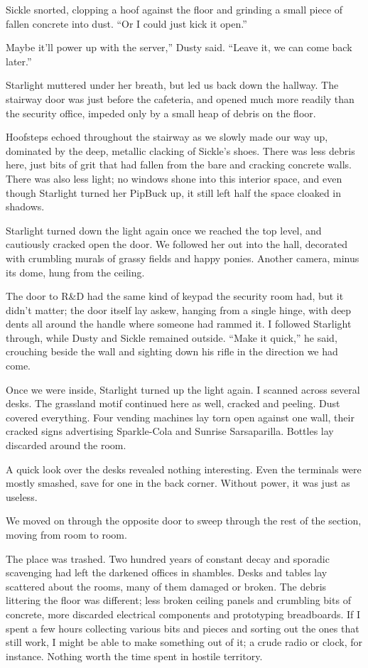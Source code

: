 Sickle snorted, clopping a hoof against the floor and grinding a small piece of fallen concrete into dust. “Or I could just kick it open.”

\leavevmode{}Maybe it’ll power up with the server,” Dusty said. “Leave it, we can come back later.”

Starlight muttered under her breath, but led us back down the hallway. The stairway door was just before the cafeteria, and opened much more readily than the security office, impeded only by a small heap of debris on the floor.

Hoofsteps echoed throughout the stairway as we slowly made our way up, dominated by the deep, metallic clacking of Sickle’s shoes. There was less debris here, just bits of grit that had fallen from the bare and cracking concrete walls. There was also less light; no windows shone into this interior space, and even though Starlight turned her PipBuck up, it still left half the space cloaked in shadows.

Starlight turned down the light again once we reached the top level, and cautiously cracked open the door. We followed her out into the hall, decorated with crumbling murals of grassy fields and happy ponies. Another camera, minus its dome, hung from the ceiling.

The door to R\&D had the same kind of keypad the security room had, but it didn’t matter; the door itself lay askew, hanging from a single hinge, with deep dents all around the handle where someone had rammed it. I followed Starlight through, while Dusty and Sickle remained outside. “Make it quick,” he said, crouching beside the wall and sighting down his rifle in the direction we had come.

Once we were inside, Starlight turned up the light again. I scanned across several desks. The grassland motif continued here as well, cracked and peeling. Dust covered everything. Four vending machines lay torn open against one wall, their cracked signs advertising Sparkle-Cola and Sunrise Sarsaparilla. Bottles lay discarded around the room.

A quick look over the desks revealed nothing interesting. Even the terminals were mostly smashed, save for one in the back corner. Without power, it was just as useless.

We moved on through the opposite door to sweep through the rest of the section, moving from room to room.

The place was trashed. Two hundred years of constant decay and sporadic scavenging had left the darkened offices in shambles. Desks and tables lay scattered about the rooms, many of them damaged or broken. The debris littering the floor was different; less broken ceiling panels and crumbling bits of concrete, more discarded electrical components and prototyping breadboards. If I spent a few hours collecting various bits and pieces and sorting out the ones that still work, I might be able to make something out of it; a crude radio or clock, for instance. Nothing worth the time spent in hostile territory.


